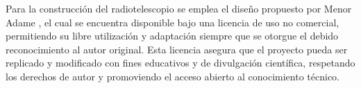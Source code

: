 Para la construcción del radiotelescopio se emplea el diseño propuesto por
Menor Adame \cite{MenorAdame2018}, el cual se encuentra disponible bajo una
licencia de uso no comercial, permitiendo su libre utilización y adaptación
siempre que se otorgue el debido reconocimiento al autor original. Esta licencia
asegura que el proyecto pueda ser replicado y modificado con fines educativos
y de divulgación científica, respetando los derechos de autor y promoviendo el
acceso abierto al conocimiento técnico.
